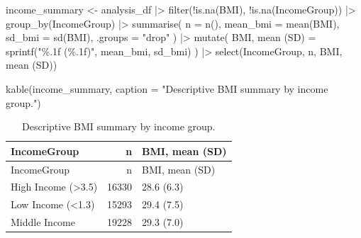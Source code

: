 \documentclass[
  letterpaper,
  DIV=11,
  numbers=noendperiod,
  oneside]{scrreprt}
\newenvironment{Shaded}{\begin{snugshade}}{\end{snugshade}}
\newcommand{\AttributeTok}[1]{\textcolor[rgb]{0.40,0.45,0.13}{#1}}
\newcommand{\FunctionTok}[1]{\textcolor[rgb]{0.28,0.35,0.67}{#1}}
\newcommand{\NormalTok}[1]{\textcolor[rgb]{0.00,0.23,0.31}{#1}}
\newcommand{\OtherTok}[1]{\textcolor[rgb]{0.00,0.23,0.31}{#1}}
\newcommand{\SpecialCharTok}[1]{\textcolor[rgb]{0.37,0.37,0.37}{#1}}
\newcommand{\StringTok}[1]{\textcolor[rgb]{0.13,0.47,0.30}{#1}}
\begin{document}

\begin{Shaded}
\begin{Highlighting}[numbers=left,,]
\NormalTok{income\_summary }\OtherTok{\textless{}{-}}\NormalTok{ analysis\_df }\SpecialCharTok{|\textgreater{}}
  \FunctionTok{filter}\NormalTok{(}\SpecialCharTok{!}\FunctionTok{is.na}\NormalTok{(BMI), }\SpecialCharTok{!}\FunctionTok{is.na}\NormalTok{(IncomeGroup)) }\SpecialCharTok{|\textgreater{}}
  \FunctionTok{group\_by}\NormalTok{(IncomeGroup) }\SpecialCharTok{|\textgreater{}}
  \FunctionTok{summarise}\NormalTok{(}
    \AttributeTok{n =} \FunctionTok{n}\NormalTok{(),}
    \AttributeTok{mean\_bmi =} \FunctionTok{mean}\NormalTok{(BMI),}
    \AttributeTok{sd\_bmi =} \FunctionTok{sd}\NormalTok{(BMI),}
    \AttributeTok{.groups =} \StringTok{"drop"}
\NormalTok{  ) }\SpecialCharTok{|\textgreater{}}
  \FunctionTok{mutate}\NormalTok{(}
    \StringTok{\textasciigrave{}}\AttributeTok{BMI, mean (SD)}\StringTok{\textasciigrave{}} \OtherTok{=} \FunctionTok{sprintf}\NormalTok{(}\StringTok{"\%.1f (\%.1f)"}\NormalTok{, mean\_bmi, sd\_bmi)}
\NormalTok{  ) }\SpecialCharTok{|\textgreater{}}
  \FunctionTok{select}\NormalTok{(IncomeGroup, n, }\StringTok{\textasciigrave{}}\AttributeTok{BMI, mean (SD)}\StringTok{\textasciigrave{}}\NormalTok{)}

\FunctionTok{kable}\NormalTok{(income\_summary, }\AttributeTok{caption =} \StringTok{"Descriptive BMI summary by income group."}\NormalTok{)}
\end{Highlighting}
\end{Shaded}

\begin{longtable}[]{@{}lrl@{}}
\caption{Descriptive BMI summary by income group.}\tabularnewline
\toprule\noalign{}
IncomeGroup & n & BMI, mean (SD) \\
\midrule\noalign{}
\endfirsthead
\toprule\noalign{}
IncomeGroup & n & BMI, mean (SD) \\
\midrule\noalign{}
\endhead
\bottomrule\noalign{}
\endlastfoot
High Income (\textgreater3.5) & 16330 & 28.6 (6.3) \\
Low Income (\textless1.3) & 15293 & 29.4 (7.5) \\
Middle Income & 19228 & 29.3 (7.0) \\
\end{longtable}
\end{document}
